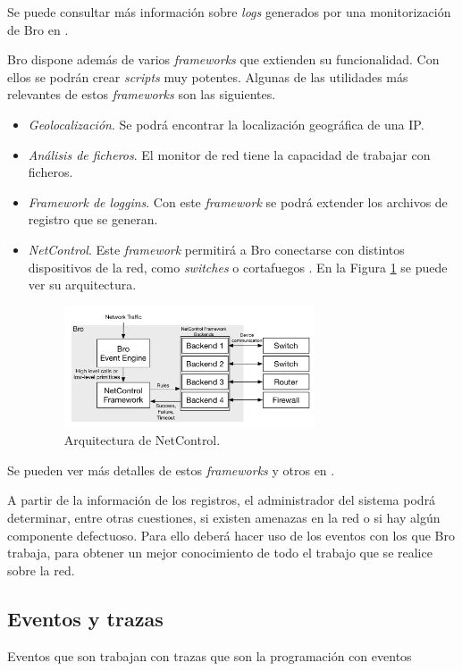 \intro Se puede consultar más información sobre \textit{logs} generados por una monitorización de Bro en \cite{brologs}.

\intro Bro dispone además de varios \textit{frameworks} que extienden su funcionalidad. Con ellos se podrán crear \textit{scripts} muy potentes. Algunas de las utilidades más relevantes de estos \textit{frameworks} son las siguientes.
\begin{itemize}
\item \textit{Geolocalización}. Se podrá encontrar la localización geográfica de una IP.
\item \textit{Análisis de ficheros}. El monitor de red tiene la capacidad de trabajar con ficheros.
\item \textit{Framework de loggins}. Con este \textit{framework} se podrá extender los archivos de registro que se generan.
\item \textit{NetControl}. Este \textit{framework} permitirá a Bro conectarse con distintos dispositivos de la red, como 
\textit{switches} o cortafuegos \cite{bronetcontrol}. En la Figura \ref{fig.netcontrol} se puede ver su arquitectura.
\begin{figure}[H]
  \includegraphics[width=0.7\textwidth]{imagenes/netcarquitectura.png}
  \centering
  \caption{Arquitectura de NetControl.}\label{fig.netcontrol}
\end{figure}
\end{itemize}


\intro Se pueden ver más detalles de estos \textit{frameworks} y otros en \cite{broframeworks}.

\intro A partir de la información de los registros, el administrador del sistema podrá determinar, entre otras cuestiones, si existen 
amenazas en la red o si hay algún componente defectuoso. Para ello deberá hacer uso de los eventos con los que Bro trabaja, para 
obtener un mejor conocimiento de todo el trabajo que se realice sobre la red.

\subsection{Eventos y trazas}
Eventos
que son
trabajan con trazas
que son
la programación con eventos

